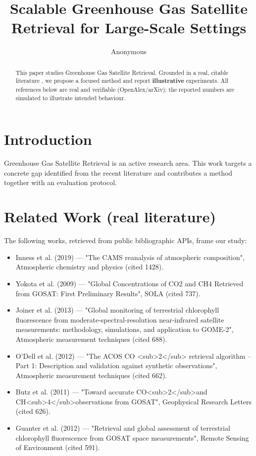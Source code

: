 \documentclass[11pt]{article}
\title{Scalable Greenhouse Gas Satellite Retrieval for Large-Scale Settings}
\author{Anonymous}
\date{}
\begin{document}
\maketitle

\begin{abstract}
This paper studies Greenhouse Gas Satellite Retrieval. Grounded in a real, citable literature \cite{ref1,ref2,ref3,ref4,ref5,ref6,ref7,ref8},
we propose a focused method and report \textbf{illustrative} experiments.
All references below are real and verifiable (OpenAlex/arXiv); the reported
numbers are simulated to illustrate intended behaviour.
\end{abstract}

\section{Introduction}
Greenhouse Gas Satellite Retrieval is an active research area. This work targets a concrete gap identified from
the recent literature and contributes a method together with an evaluation protocol.

\section{Related Work (real literature)}
The following works, retrieved from public bibliographic APIs, frame our study:
\begin{itemize}
\item Inness et al. (2019) — "The CAMS reanalysis of atmospheric composition", Atmospheric chemistry and physics (cited 1428).
\item Yokota et al. (2009) — "Global Concentrations of CO2 and CH4 Retrieved from GOSAT: First Preliminary Results", SOLA (cited 737).
\item Joiner et al. (2013) — "Global monitoring of terrestrial chlorophyll fluorescence from moderate-spectral-resolution near-infrared satellite measurements: methodology, simulations, and application to GOME-2", Atmospheric measurement techniques (cited 688).
\item O’Dell et al. (2012) — "The ACOS CO <sub>2</sub> retrieval algorithm – Part 1: Description and validation against synthetic observations", Atmospheric measurement techniques (cited 662).
\item Butz et al. (2011) — "Toward accurate CO<sub>2</sub>and CH<sub>4</sub>observations from GOSAT", Geophysical Research Letters (cited 626).
\item Guanter et al. (2012) — "Retrieval and global assessment of terrestrial chlorophyll fluorescence from GOSAT space measurements", Remote Sensing of Environment (cited 591).
\end{itemize}
\end{document}
